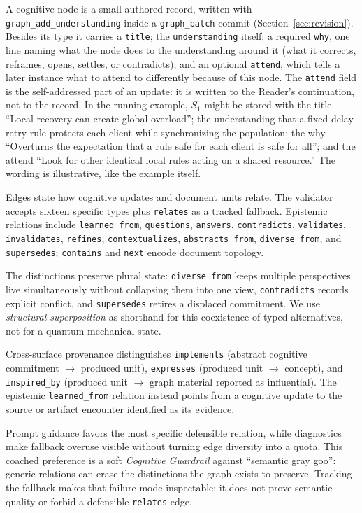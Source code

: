 A cognitive node is a small authored record, written with \texttt{graph\_add\_understanding} inside a \texttt{graph\_batch} commit (Section~\ref{sec:revision}). Besides its type it carries a \texttt{title}; the \texttt{understanding} itself; a required \texttt{why}, one line naming what the node does to the understanding around it (what it corrects, reframes, opens, settles, or contradicts); and an optional \texttt{attend}, which tells a later instance what to attend to differently because of this node. The \texttt{attend} field is the self-addressed part of an update: it is written to the Reader's continuation, not to the record. In the running example, $S_1$ might be stored with the title ``Local recovery can create global overload''; the understanding that a fixed-delay retry rule protects each client while synchronizing the population; the why ``Overturns the expectation that a rule safe for each client is safe for all''; and the attend ``Look for other identical local rules acting on a shared resource.'' The wording is illustrative, like the example itself.

Edges state how cognitive updates and document units relate. The validator accepts sixteen specific types plus \texttt{relates} as a tracked fallback. Epistemic relations include \texttt{learned\_from}, \texttt{questions}, \texttt{answers}, \texttt{contradicts}, \texttt{validates}, \texttt{invalidates}, \texttt{refines}, \texttt{contextualizes}, \texttt{abstracts\_from}, \texttt{diverse\_from}, and \texttt{supersedes}; \texttt{contains} and \texttt{next} encode document topology.

The distinctions preserve plural state: \texttt{diverse\_from} keeps multiple perspectives live simultaneously without collapsing them into one view, \texttt{contradicts} records explicit conflict, and \texttt{supersedes} retires a displaced commitment. We use \emph{structural superposition} as shorthand for this coexistence of typed alternatives, not for a quantum-mechanical state.

Cross-surface provenance distinguishes \texttt{implements} (abstract cognitive commitment $\rightarrow$ produced unit), \texttt{expresses} (produced unit $\rightarrow$ concept), and \texttt{inspired\_by} (produced unit $\rightarrow$ graph material reported as influential). The epistemic \texttt{learned\_from} relation instead points from a cognitive update to the source or artifact encounter identified as its evidence.

Prompt guidance favors the most specific defensible relation, while diagnostics make fallback overuse visible without turning edge diversity into a quota. This coached preference is a soft \emph{Cognitive Guardrail} against ``semantic gray goo'': generic relations can erase the distinctions the graph exists to preserve. Tracking the fallback makes that failure mode inspectable; it does not prove semantic quality or forbid a defensible \texttt{relates} edge.

